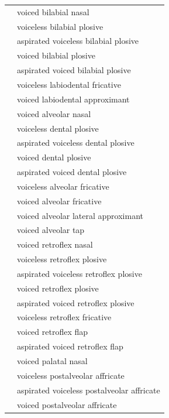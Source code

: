 \documentclass[12pt]{article}
\begin{document}
\begin{xltabular}{\textwidth}{lL}
   & voiced bilabial nasal \\
   & voiceless bilabial plosive \\
   & aspirated voiceless bilabial plosive \\
   & voiced bilabial plosive \\
   & aspirated voiced bilabial plosive \\
   & voiceless labiodental fricative \\
   & voiced labiodental approximant \\
   & voiced alveolar nasal \\
   & voiceless dental plosive \\
   & aspirated voiceless dental plosive \\
   & voiced dental plosive \\
   & aspirated voiced dental plosive \\
   & voiceless alveolar fricative \\
   & voiced alveolar fricative \\
   & voiced alveolar lateral approximant \\
   & voiced alveolar tap \\
   & voiced retroflex nasal \\
   & voiceless retroflex plosive \\
   & aspirated voiceless retroflex plosive \\
   & voiced retroflex plosive \\
   & aspirated voiced retroflex plosive \\
   & voiceless retroflex fricative \\
   & voiced retroflex flap \\
   & aspirated voiced retroflex flap \\
  \ipa{\textltailn} & voiced palatal nasal \\
  \ipa{\t{\textteshlig}} & voiceless postalveolar affricate \\
   & aspirated voiceless postalveolar affricate \\
  \ipa{\t{\textdyoghlig}} & voiced postalveolar affricate \\

\end{xltabular}
\end{document}
